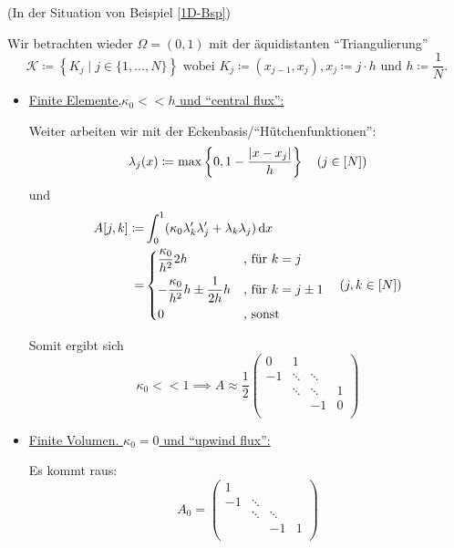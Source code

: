 \begin{examples}(In der Situation von Beispiel \ref{1D-Bsp})
	
	Wir betrachten wieder $ \Omega = (0,1) $ mit der äquidistanten \enquote{Triangulierung}
	 \[ \mathcal{K} \coloneqq \left\{K_j\mid j \in \{1, \dots ,N\}\right\} \text{ wobei } K_j \coloneqq (x_{j-1}, x_j), x_j \coloneqq j \cdot h \text{ und } h \coloneqq \frac{1}{N}.\]
	 
	 \begin{itemize}
	 	\item \underline{Finite Elemente,$ \kappa_0 << h $ und \enquote{central flux}:}
	 	
	 	Weiter arbeiten wir mit der Eckenbasis/\enquote{Hütchenfunktionen}:
	 	\[ \lambda_j(x) \coloneqq \max\left\{ 0, 1 - \frac{\abs{x-x_j}}{h} \right\} \quad (j \in [N])\]
	 	und 
	 	\begin{align*}
		 	A[j,k] \coloneqq& \int_{0}^{1} (\kappa_0 \lambda_k' \lambda_j' + \lambda_k \lambda_j) \mathop{}\!\mathrm{d} x\\
		 	=& \begin{dcases}
			 	\frac{\kappa_0}{h^2}2h &\text{, für } k = j\\
			 	-\frac{\kappa_0}{h^2} h \pm \frac{1}{2h} h &\text{, für } k = j \pm 1 \\
			 	0 &\text{, sonst}
		 	\end{dcases} \quad (j,k\in[N])
	 	\end{align*}
	 	
	 	Somit ergibt sich
	 	\[\kappa_0 << 1 \implies A \approx \frac{1}{2} \begin{pmatrix}
	 	0& 1& & \\
	 	-1& \ddots&\ddots & \\
	 	& \ddots& \ddots& 1\\
	 	& & -1& 0\\
	 	\end{pmatrix} \]
	 	
	 	\item \underline{Finite Volumen. $ \kappa_0 = 0 $ und \enquote{upwind flux}:}
	 	
	 	Es kommt raus:
	 	\[A_0 =  \begin{pmatrix}
	 	1& & & \\
	 	-1& \ddots& & \\
	 	& \ddots& \ddots& \\
	 	& & -1& 1\\
	 	\end{pmatrix}  \]
	 \end{itemize}
\end{examples}

